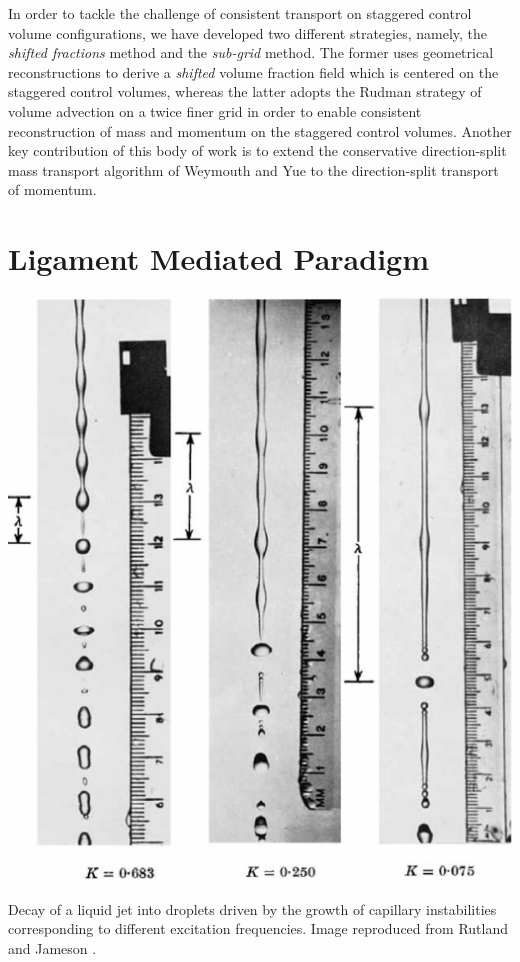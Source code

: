 In order to tackle the challenge of consistent transport on staggered control 
volume configurations, we have developed two different strategies, namely, 
the \textit{shifted fractions} method and the \textit{sub-grid} method. 
The former uses geometrical reconstructions to derive a 
\textit{shifted} volume fraction field which is centered on the staggered
control volumes, whereas the latter adopts the Rudman \cite{rudman1998volume} 
strategy of volume advection on a twice finer grid in order to 
enable consistent reconstruction of mass and momentum on the staggered control volumes. 
Another key contribution of this body of work is to extend the conservative 
direction-split mass transport algorithm of Weymouth and Yue  
to the direction-split transport of momentum.

\section*{Ligament Mediated Paradigm}

\begin{marginfigure}[1cm]
\centering
\includegraphics{plots/intro/jet.pdf}
\caption{Decay of a liquid jet into droplets driven by the growth of capillary instabilities corresponding 
	to different excitation frequencies. Image reproduced from Rutland and Jameson \cite{rutland1971non}.
	} 
\label{jet}
\end{marginfigure}

